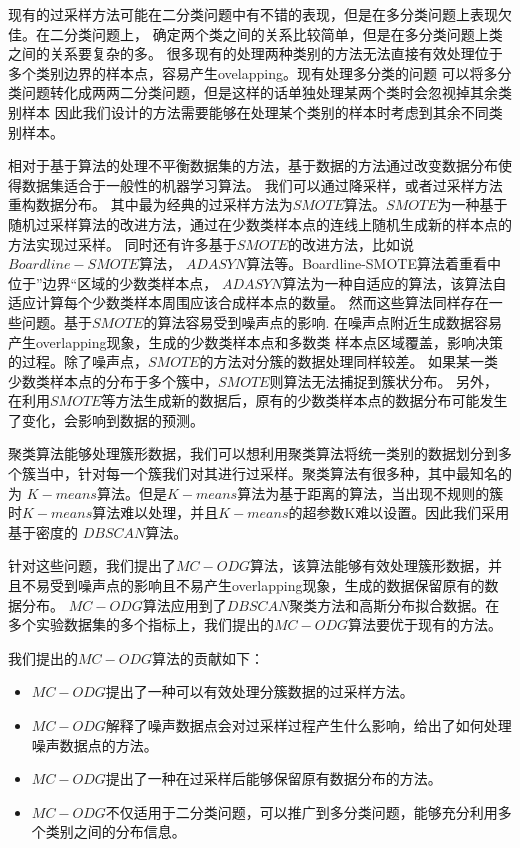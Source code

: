 \documentclass{article}
\begin{document}
现有的过采样方法可能在二分类问题中有不错的表现，但是在多分类问题上表现欠佳。在二分类问题上，
确定两个类之间的关系比较简单，但是在多分类问题上类之间的关系要复杂的多。
很多现有的处理两种类别的方法无法直接有效处理位于多个类别边界的样本点，容易产生ovelapping。现有处理多分类的问题
可以将多分类问题转化成两两二分类问题，但是这样的话单独处理某两个类时会忽视掉其余类别样本
因此我们设计的方法需要能够在处理某个类别的样本时考虑到其余不同类别样本。


相对于基于算法的处理不平衡数据集的方法，基于数据的方法通过改变数据分布使得数据集适合于一般性的机器学习算法。
我们可以通过降采样，或者过采样方法重构数据分布。
其中最为经典的过采样方法为$SMOTE$\cite{2002SMOTE}算法。$SMOTE$为一种基于随机过采样算法的改进方法，通过在少数类样本点的连线上随机生成新的样本点的方法实现过采样。
同时还有许多基于$SMOTE$的改进方法，比如说$Boardline-SMOTE$\cite{2005Borderline}算法，
$ADASYN$\cite{2008ADASYN}算法等。Boardline-SMOTE算法着重看中位于”边界“区域的少数类样本点，
$ADASYN$算法为一种自适应的算法，该算法自适应计算每个少数类样本周围应该合成样本点的数量。
然而这些算法同样存在一些问题。基于$SMOTE$的算法容易受到噪声点的影响\cite{2017CCR}.
在噪声点附近生成数据容易产生overlapping现象，生成的少数类样本点和多数类
样本点区域覆盖，影响决策的过程。除了噪声点，$SMOTE$的方法对分簇的数据处理同样较差。
如果某一类少数类样本点的分布于多个簇中，$SMOTE$则算法无法捕捉到簇状分布。
另外，在利用$SMOTE$等方法生成新的数据后，原有的少数类样本点的数据分布可能发生了变化，会影响到数据的预测。

聚类算法能够处理簇形数据，我们可以想利用聚类算法将统一类别的数据划分到多个簇当中，针对每一个簇我们对其进行过采样。聚类算法有很多种，其中最知名的为
$K-means$算法。但是$K-means$算法为基于距离的算法，当出现不规则的簇时$K-means$算法难以处理，并且$K-means$的超参数K难以设置。因此我们采用基于密度的
$DBSCAN$算法。


针对这些问题，我们提出了$MC-ODG$算法，该算法能够有效处理簇形数据，并且不易受到噪声点的影响且不易产生overlapping现象，生成的数据保留原有的数据分布。
$MC-ODG$算法应用到了$DBSCAN$聚类方法和高斯分布拟合数据。在多个实验数据集的多个指标上，我们提出的$MC-ODG$算法要优于现有的方法。

我们提出的$MC-ODG$算法的贡献如下：
\begin{itemize}
  \item $MC-ODG$提出了一种可以有效处理分簇数据的过采样方法。
  \item $MC-ODG$解释了噪声数据点会对过采样过程产生什么影响，给出了如何处理噪声数据点的方法。
  \item $MC-ODG$提出了一种在过采样后能够保留原有数据分布的方法。
  \item $MC-ODG$不仅适用于二分类问题，可以推广到多分类问题，能够充分利用多个类别之间的分布信息。
\end{itemize}
\end{document}
